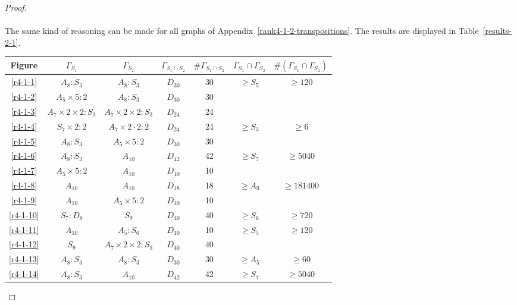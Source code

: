 \begin{proof}
  \paragraph{}
  The same kind of reasoning can be made for all graphs of Appendix~\ref{rank4-1-2-transpositions}. The results are displayed in Table~\ref{results-2-1}.

\begin{table}
  \centering
  \begin{tabular}{|c|c|c|c|c|c|c|}
    \hline
    Figure & $\Gamma_{S_1}$ & $\Gamma_{S_2}$ & $\Gamma_{S_1 \cap S_2}$ & $\#\Gamma_{S_1 \cap S_2}$ & $\Gamma_{S_1} \cap \Gamma_{S_2}$ & $\#(\Gamma_{S_1} \cap \Gamma_{S_2})$ \\ \hline

    \ref{r4-1-1} & $A_8 : S_3$ & $A_8 : S_3$ & $D_{30}$ & 30 & $\ge S_5$ & $\ge 120$ \\ \hline
    \ref{r4-1-2} & $A_5 \times 5 : 2$ & $A_8 : S_3$ & $D_{30}$ & 30 & & \\ \hline
    \ref{r4-1-3} & $A_7 \times 2 \times 2 : S_3$ & $A_7 \times 2 \times 2 : S_3$ & $D_{24}$ & 24 & & \\ \hline
    \ref{r4-1-4} & $S_7 \times 2 : 2$ & $A_7  \times 2 \cdot 2 : 2$ & $D_{24}$ & 24 & $\ge S_3$ & $\ge 6$ \\ \hline
    \ref{r4-1-5} & $A_8 : S_3$ & $A_5 \times 5 : 2$ & $D_{30}$ & 30 & & \\ \hline
    \ref{r4-1-6} & $A_8 : S_3$ & $A_{10}$ & $D_{42}$ & 42 & $\ge S_7$ & $\ge 5040$ \\ \hline
    \ref{r4-1-7} & $A_5 \times 5 : 2$ & $A_{10}$ & $D_{10}$ & 10 & & \\ \hline
    \ref{r4-1-8} & $A_{10}$ & $A_{10}$ & $D_{18}$ & 18 & $\ge A_9$ & $\ge 181400$ \\ \hline
    \ref{r4-1-9} & $A_{10}$ & $A_5 \times 5 : 2$ & $D_{10}$ & 10 & & \\ \hline
    \ref{r4-1-10}& $S_7 : D_8$ & $S_9$ & $D_{40}$ & 40 & $\ge S_6$ & $\ge 720$ \\ \hline
    \ref{r4-1-11}& $A_{10}$ & $A_5 : S_6$ & $D_{10}$ & 10 & $\ge S_5$ & $\ge 120$ \\ \hline
    \ref{r4-1-12}& $S_9$ & $A_7 \times 2 \times 2:S_3$ & $D_{40}$ & 40 & & \\ \hline
    \ref{r4-1-13}& $A_8 : S_3$ & $A_8 : S_3$ & $D_{30}$ & 30 & $\ge A_5$ & $\ge 60$ \\ \hline
    \ref{r4-1-14}& $A_8 : S_3$ & $A_{10}$ & $D_{42}$ & 42 & $\ge S_7$ & $\ge 5040$ \\ \hline

\end{tabular}
\end{table}
\end{proof}

